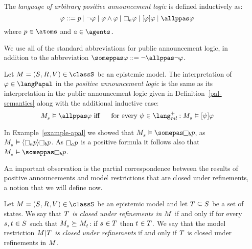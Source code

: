\begin{definition}\label{papal-syntax}
The {\em language of arbitrary positive announcement logic \langPapal{}} is defined inductively as:
$$
    \phi ::=
        \atomP \mid
        \neg \phi \mid
        \phi \land \phi \mid
        \necessaryA \phi \mid
        \announceA{\phi} \phi \mid
        \allppas \phi
$$
where $\atomP \in \atoms$ and $\agentA \in \agents$.
\end{definition}

We use all of the standard abbreviations for public announcement logic, in addition to the abbreviation $\someppas \phi ::= \neg \allppas \neg \phi$.

\begin{definition}\label{papal-semantics}
Let $\kModelAndTuple \in \classS$ be an epistemic model.
The interpretation of $\phi \in \langPapal$ in the {\em positive announcement logic \logicPapalS{}} is the same as its interpretation in the public announcement logic \logicPalS{} given in Definition~\ref{pal-semantics} along with the additional inductive case:
\begin{eqnarray*}
    \kPModel{\kStateS} \entails \allppas \phi &\text{ iff }& \text{ for every } \psi \in \langMlPlus : \kPModel{\kStateS} \entails \announceA{\psi} \phi
\end{eqnarray*}
\end{definition}

\begin{example}\label{example-papal}
In Example~\ref{example-apal} we showed that $\kPModel{\kStateS} \entails \somepas \knowsB \atomP$, as $\kPModel{\kStateS} \entails \announceE{\knowsA \atomP} \knowsB \atomP$.
As $\knowsA \atomP$ is a positive formula it follows also that $\kPModel{\kStateS} \entails \someppas \knowsB \atomP$.
\end{example}

An important observation is the partial correspondence between the results of positive announcements and model restrictions that are closed under refinements, a notion that we will define now.

\begin{definition}\label{closed-under-refinements}
Let $\kModelAndTuple \in \classS$ be an epistemic model and 
let $\kStatesT \subseteq \kStates$ be a set of states.
We say that {\em $\kStatesT$ is closed under refinements in $\kModel$} if and only if for every $\kStateS, \kStateT \in \kStates$ such that $\kPModel{\kStateS} \simulates \kPModel{\kStateT}$: if $\kStateS \in \kStatesT$ then $\kStateT \in \kStatesT$.
We say that the model restriction {\em $\restrict{\kModel}{\kStatesT}$ is closed under refinements} if and only if $\kStatesT$ is closed under refinements in $\kModel$.
\end{definition}


